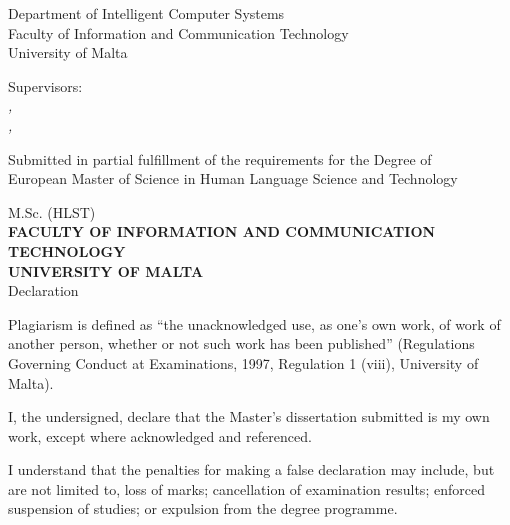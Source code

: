\begin{center}
Department of Intelligent Computer Systems\\
Faculty of Information and Communication Technology\\
University of Malta\\
\YearSubmitted

\vspace{20mm}

{Supervisors:} \\
\textit{
    \Supervisor, \SupervisorUni\\
    \CoSupervisor, \CoSupervisorUni
}

\vfill

{Submitted in partial fulfillment of the requirements for the Degree of \\ European Master of Science in Human Language Science and Technology}

\end{center}

\newpage

\pagestyle{plain}

\begin{center}

M.Sc. (HLST)\\
\textbf{FACULTY OF INFORMATION AND
COMMUNICATION TECHNOLOGY\\
UNIVERSITY OF MALTA}\\[15mm]

Declaration\\[15mm]

\end{center}

\noindent Plagiarism is defined as “the unacknowledged use, as one’s own work, of work of
another person, whether or not such work has been published” (Regulations
Governing Conduct at Examinations, 1997, Regulation 1 (viii), University of Malta).

\bigskip

\noindent I, the undersigned, declare that the Master’s dissertation submitted is my own work,
except where acknowledged and referenced.

\bigskip

\noindent I understand that the penalties for making a false declaration may include, but are not
limited to, loss of marks; cancellation of examination results; enforced suspension of
studies; or expulsion from the degree programme.
 

